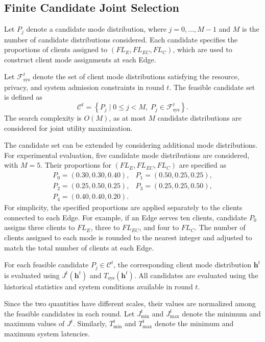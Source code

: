 \documentclass[5p,times]{elsarticle}
\theoremstyle{plain}
\theoremstyle{definition}
\theoremstyle{remark}
\begin{document}
\subsection{Finite Candidate Joint Selection}
\label{sec:global_optimization}

Let $P_j$ denote a candidate mode distribution,
where $j=0,\ldots,M-1$ and $M$ is the number
of candidate distributions considered.
Each candidate specifies the proportions
of clients assigned to $(FL_E,FL_{EC},FL_C)$,
which are used to construct client mode
assignments at each Edge.

Let $\mathcal F_{\mathrm{sys}}^t$ denote the set
of client mode distributions satisfying the
resource, privacy, and system admission
constraints in round $t$.
The feasible candidate set is defined as
\begin{equation}
\mathcal C^t
=
\left\{
P_j \mid
0\leq j<M,\;
P_j\in\mathcal F_{\mathrm{sys}}^t
\right\}.
\label{eq:feasible_candidates}
\end{equation}
The search complexity is $O(M)$,
as at most $M$ candidate distributions
are considered for joint utility maximization.

The candidate set can be extended by considering
additional mode distributions.
For experimental evaluation, five candidate
mode distributions are considered, with $M=5$.
Their proportions for $(FL_E,FL_{EC},FL_C)$
are specified as
\[
\begin{array}{ll}
P_0=(0.30,0.30,0.40), & P_1=(0.50,0.25,0.25),\\
P_2=(0.25,0.50,0.25), & P_3=(0.25,0.25,0.50),\\
P_4=(0.40,0.40,0.20). &
\end{array}
\]
For simplicity, the specified proportions
are applied separately to the clients
connected to each Edge.
For example, if an Edge serves ten clients,
candidate $P_0$ assigns three clients to
$FL_E$, three to $FL_{EC}$, and four to $FL_C$.
The number of clients assigned to each mode
is rounded to the nearest integer and adjusted
to match the total number of clients at each Edge.

For each feasible candidate $P_j\in\mathcal C^t$,
the corresponding client mode distribution
$\mathbf h^t$ is evaluated using
$J^t(\mathbf h^t)$ and
$T_{\mathrm{sys}}(\mathbf h^t)$.
All candidates are evaluated using the
historical statistics and system conditions
available in round $t$.

Since the two quantities have different scales,
their values are normalized among the feasible
candidates in each round.
Let $J_{\min}^t$ and $J_{\max}^t$ denote the
minimum and maximum values of $J^t$.
Similarly, $T_{\min}^t$ and $T_{\max}^t$
denote the minimum and maximum system latencies.
\end{document}
